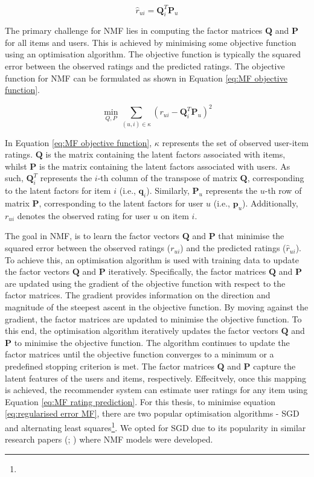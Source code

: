 \begin{equation}
    \hat{r}_{u i} = \mathbf{Q}_i^T \mathbf{P}_u
    \label{eq:MF rating prediction}
    \end{equation}


The primary challenge for NMF lies in computing the factor matrices $\mathbf{Q}$ and $\mathbf{P}$ for all items and users. This is achieved by minimising some objective function using an optimisation algorithm. The objective function is typically the squared error between the observed ratings and the predicted ratings. The objective function for NMF can be formulated as shown in Equation \ref{eq:MF objective function}.

\begin{equation}
    \label{eq:MF objective function}
    \min_{Q, P} \sum_{(u, i) \in \kappa} \left(r_{ui} - \mathbf{Q}^T_i \mathbf{P}_u\right)^2
\end{equation}

In Equation \ref{eq:MF objective function}, $\kappa$ represents the set of observed user-item ratings. $\mathbf{Q}$ is the matrix containing the latent factors associated with items, whilst $\mathbf{P}$ is the matrix containing the latent factors associated with users. As such, $\mathbf{Q}^T_i$ represents the $i$-th column of the transpose of matrix $\mathbf{Q}$, corresponding to the latent factors for item $i$ (i.e., $\mathbf{q}_i$). Similarly, $\mathbf{P}_u$ represents the $u$-th row of matrix $\mathbf{P}$, corresponding to the latent factors for user $u$ (i.e., $\mathbf{p}_u$). Additionally, $r_{ui}$ denotes the observed rating for user $u$ on item $i$. 

The goal in NMF, is to learn the factor vectors $\mathbf{Q}$ and $\mathbf{P}$ that minimise the squared error between the observed ratings ($r_{ui}$) and the predicted ratings ($\hat{r}_{ui}$). To achieve this, an optimisation algorithm is used with training data to update the factor vectors $\mathbf{Q}$ and $\mathbf{P}$ iteratively. Specifically, the factor matrices $\mathbf{Q}$ and $\mathbf{P}$ are updated using the gradient of the objective function with respect to the factor matrices. The gradient provides information on the direction and magnitude of the steepest ascent in the objective function. By moving against the gradient, the factor matrices are updated to minimise the objective function. To this end, the optimisation algorithm iteratively updates the factor vectors $\mathbf{Q}$ and $\mathbf{P}$ to minimise the objective function. The algorithm continues to update the factor matrices until the objective function converges to a minimum or a predefined stopping criterion is met. The factor matrices $\mathbf{Q}$ and $\mathbf{P}$ capture the latent features of the users and items, respectively. Effecitvely, once this mapping is achieved, the recommender system can estimate user ratings for any item using Equation \ref{eq:MF rating prediction}. For this thesis, to minimise equation \ref{eq:regularised error MF}, there are two popular optimisation algorithms - SGD and alternating least squares\footnote{}. We opted for SGD due to its popularity in similar research papers (\cite{rendle2020neural}; \cite{lee2000algorithms}) where NMF models were developed. 

